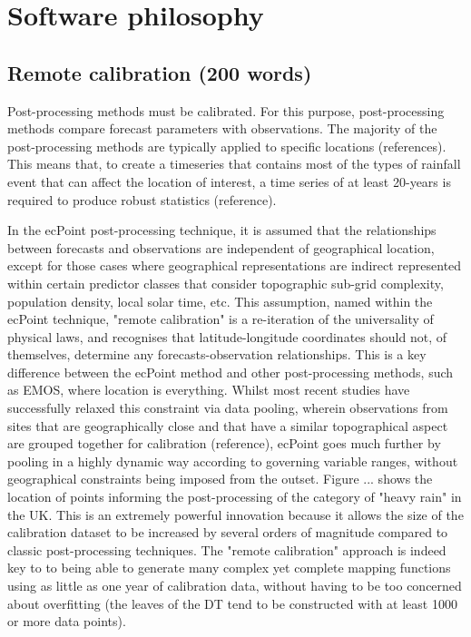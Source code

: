 \documentclass[techmemo]{ecmwfrep}%
\begin{document}
\section{Software philosophy}

\subsection{Remote calibration (200 words)}

Post-processing methods must be calibrated. For this purpose, post-processing methods compare forecast parameters with observations. The majority of the post-processing methods are typically applied to specific locations (references). This means that, to create a timeseries that contains most of the types of rainfall event that can affect the location of interest, a time series of at least 20-years is required to produce robust statistics (reference). 

In the ecPoint post-processing technique, it is assumed that the relationships between forecasts and observations are independent of geographical location, except for those cases where geographical representations are indirect represented within certain predictor classes that consider topographic sub-grid complexity, population density, local solar time, etc. This assumption, named within the ecPoint technique, "remote calibration" is a re-iteration of the universality of physical laws, and recognises that latitude-longitude coordinates should not, of themselves, determine any forecasts-observation relationships. This is a key difference between the ecPoint method and other post-processing methods, such as EMOS, where location is everything. Whilst most recent studies have successfully relaxed this constraint via data pooling, wherein observations from sites that are geographically close and that have a similar topographical aspect are grouped together for calibration (reference), ecPoint goes much further by pooling in a highly dynamic way according to governing variable ranges, without geographical constraints being imposed from the outset. Figure ... shows the location of points informing the post-processing of the category of "heavy rain" in the UK. This is an extremely powerful innovation because it allows the size of the calibration dataset to be increased by several orders of magnitude compared to classic post-processing techniques. The "remote calibration" approach is indeed key to to being able to generate many complex yet complete mapping functions using as little as one year of calibration data, without having to be too concerned about overfitting (the leaves of the DT tend to be constructed with at least 1000 or more data points).
 
\end{document}
